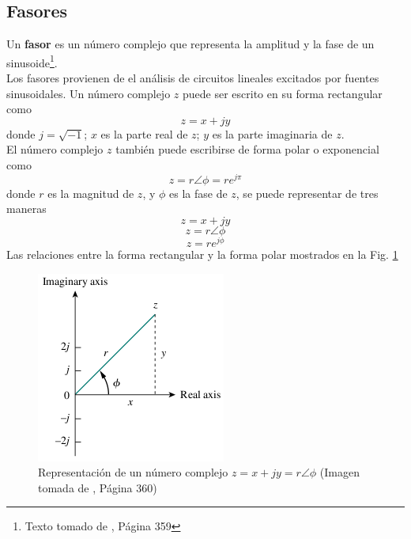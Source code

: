 \documentclass[twocolumn]{IEEEtran}
\begin{document}
\subsection{Fasores}
\noindent
Un \textbf{fasor} es un número complejo que representa la amplitud y la fase de un sinusoide\footnote{Texto tomado de \cite{sadiku}, Página 359}.\\
Los fasores provienen de el análisis de circuitos lineales excitados por fuentes sinusoidales. Un número complejo $z$ puede ser escrito en su forma rectangular como 
\begin{equation}
 z = x + jy
\label{ecu9}
\end{equation}
\noindent
donde $j = \sqrt{-1}$; $x$ es la parte real de $z$; $y$ es la parte imaginaria de $z$.\\
El número complejo $z$ también puede escribirse de forma polar o exponencial como
\begin{equation}
 z = r\angle \phi  = r{e^{j\pi }}
\label{ecu10}
\end{equation}
\noindent
donde $r$ es la magnitud de $z$, y $\phi$ es la fase de $z$, se puede representar de tres maneras
\begin{equation}
 z = x+ jy
\label{ecu11}
\end{equation}
\begin{equation}
 z = r \angle \phi
\label{ecu12}
\end{equation}
\begin{equation}
 z = r{e^{j\phi }}
\label{cu13}
\end{equation}
\noindent
Las relaciones entre la forma rectangular y la forma polar mostrados en la Fig. \ref{fig2}
\begin{figure}[H]
	\centering
		\includegraphics[scale=0.45]{reppolar.png}
	\caption{Representación de un número complejo $z = x +jy = r \angle \phi$ (Imagen tomada de  \cite{sadiku}, Página 360)}
	\label{fig2}
\end{figure}
\end{document}
